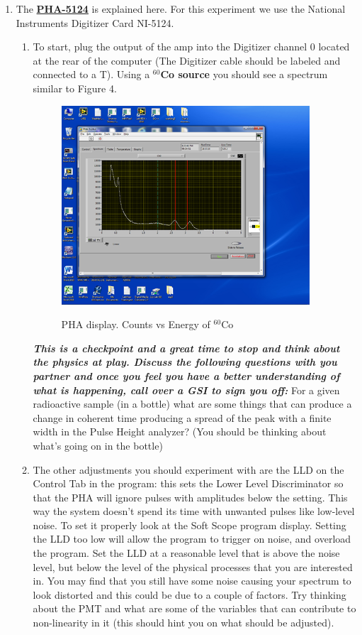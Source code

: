 \documentclass{../lab}
\begin{document}
\begin{enumerate}
    \item The \href{http://experimentationlab.berkeley.edu/PHA-5124Program}{\textbf{PHA-5124}} is explained here. For this experiment we use the National Instruments Digitizer Card NI-5124.
    \begin{enumerate}
        \item To start, plug the output of the amp into the Digitizer channel 0 located at the rear of the computer (The Digitizer cable should be labeled and connected to a T). Using a \textbf{$^{60}$Co source} you should see a spectrum similar to Figure 4.

        \begin{figure}[h]
            \centering
            \href{http://experimentationlab.berkeley.edu/sites/default/files/images/350px-CO-60_Spectrum.png}{\includegraphics[width=0.5\linewidth]{images/350px-CO-60_Spectrum.png}}
            \caption{PHA display. Counts vs Energy of $^{60}$Co}
            \label{fig:350px-CO-60_Spectrum}
        \end{figure}

    \emph{\textbf{This is a checkpoint and a great time to stop and think about the physics at play. Discuss the following questions with you partner and once you feel you have a better understanding of what is happening, call over a GSI to sign you off:  }}
               For a given radioactive sample (in a bottle) what are  some things that can produce a change in coherent time producing a spread of the peak with a finite width in the Pulse Height analyzer? (You should be thinking about what's going on in the bottle)

        \item The other adjustments you should experiment with are the LLD on the Control Tab in the program: this sets the Lower Level Discriminator so that the PHA will ignore pulses with amplitudes below the setting. This way the system doesn't spend its time with unwanted pulses like low-level noise. To set it properly look at the Soft Scope program display. Setting the LLD too low will allow the program to trigger on noise, and overload the program. Set the LLD at a reasonable level that is above the noise level, but below the level of the physical processes that you are interested in. You may find that you still have some noise causing your spectrum to look distorted and this could be due to a couple of factors. Try thinking about the PMT and what are some of the variables that can contribute to non-linearity in it (this should hint you on what should be adjusted).


\end{enumerate}
\end{enumerate}
\end{document}
